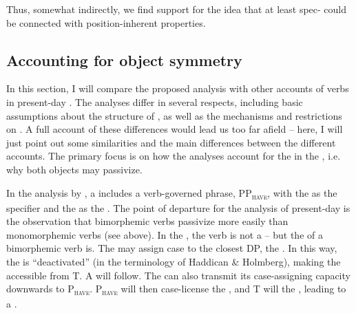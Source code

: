 \documentclass[output=paper]{langscibook}
\begin{document}
\z
\z

Thus, somewhat indirectly, we find support for the idea that at least spec- could be connected with position-inherent properties.

\subsection{Accounting for object symmetry}\label{sec:falk:4.5}


In this section, I will compare the proposed analysis with other accounts of  verbs in present-day . The analyses differ in several respects, including basic assumptions about the structure of , as well as the mechanisms and restrictions on . A full account of these differences would lead us too far afield – here, I will just point out some similarities and the main differences between the different accounts. The primary focus is on how the analyses account for the  in the , i.e. why both objects may passivize.


In the analysis by \citet{HaddicanHolmberg2019}, a  includes a verb-governed phrase, PP\textsc{\textsubscript{have}}, with the  as the specifier and the  as the . The point of departure for the analysis of present-day  is the observation that bimorphemic  verbs passivize more easily than monomorphemic  verbs (see  above). In the , the verb is not a  – but the  of a bimorphemic verb is. The  may assign case to the closest DP, the . In this way, the  is “deactivated” (in the terminology of Haddican \& Holmberg), making the  accessible from T. A  will follow. The  can also transmit its case-assigning capacity downwards to P\textsc{\textsubscript{have}}. P\textsc{\textsubscript{have}} will then case-license the , and T will  the , leading to a .
\end{document}
